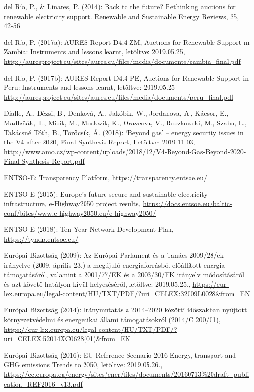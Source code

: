 \documentclass[twoside, magyar, showtrims]{corvinusphd}
\begin{document}
\begin{thebibliography}{99}
del Río, P., \& Linares, P. (2014): Back to the future? Rethinking auctions for renewable electricity support. Renewable and Sustainable Energy Reviews, 35, 42-56.

del Río, P. (2017a): AURES Report D4.4-ZM,  Auctions for Renewable  Support in Zambia: Instruments and lessons learnt, letöltve: 2019.05.25,
\url{http://auresproject.eu/sites/aures.eu/files/media/documents/zambia\_final.pdf}

del Río, P. (2017b): AURES Report D4.4-PE, Auctions for Renewable Support in Peru: Instruments and lessons learnt, letöltve: 2019.05.25
\url{http://auresproject.eu/sites/aures.eu/files/media/documents/peru\_final.pdf}

Diallo, A., Dézsi, B., Denková, A., Jakóbik, W., Jordanova, A., Kácsor, E., Madleňák, T., Misik, M., Moskwik, K.,
Oravcova, V., Roszkowski, M., Szabó, L., Takácsné Tóth, B., Törőcsik, Á. (2018): ‘Beyond gas’ – energy security issues in the V4 after 2020, Final Synthesis Report,
Letöltve: 2019.11.03,
\url{http://www.amo.cz/wp-content/uploads/2018/12/V4-Beyond-Gas-Beyond-2020-Final-Synthesis-Report.pdf}

ENTSO-E: Transparency Platform,
\url{https://transparency.entsoe.eu/}

ENTSO-E (2015): Europe’s  future  secure and  sustainable  electricity  infrastructure, e-Highway2050 project results, 
\url{https://docs.entsoe.eu/baltic-conf/bites/www.e-highway2050.eu/e-highway2050/}

ENTSO-E (2018): Ten Year Network Development Plan, 
\url{https://tyndp.entsoe.eu/}

Európai Bizottság (2009): Az Európai Parlament és a Tanács 2009/28/ek irányelve (2009. április 23.) a megújuló energiaforrásból előállított energia támogatásáról, valamint a 2001/77/EK és a 2003/30/EK irányelv módosításáról és azt követő hatályon kívül helyezéséről, letöltve: 2019.05.25., 
\url{https://eur-lex.europa.eu/legal-content/HU/TXT/PDF/?uri=CELEX:32009L0028\&from=EN}

Európai Bizottság (2014): Iránymutatás a 2014–2020 közötti időszakban nyújtott környezetvédelmi és energetikai állami támogatásokról (2014/C 200/01), 
\url{https://eur-lex.europa.eu/legal-content/HU/TXT/PDF/?uri=CELEX:52014XC0628(01)\&from=EN}

    Európai Bizottság (2016): EU Reference Scenario 2016 Energy, transport and GHG emissions Trends to 2050, letöltve: 2019.05.26.,
    \url{https://ec.europa.eu/energy/sites/ener/files/documents/20160713\%20draft\_publication\_REF2016\_v13.pdf}


\end{thebibliography}
\end{document}
